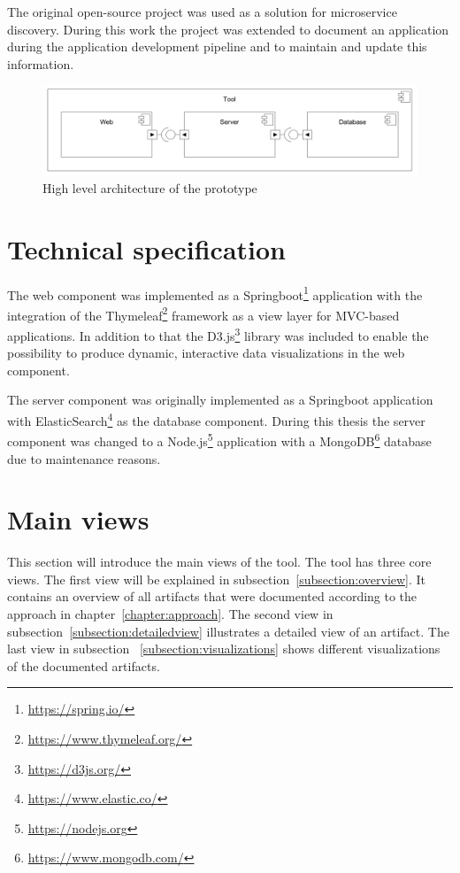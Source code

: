 The original open-source project was used as a solution for microservice discovery. During this work the project was extended to document an application during the application development pipeline and to maintain and update this information.

\begin{figure}[htpb]
  \centering
  \includegraphics[width=1.0\textwidth]{figures/pivio-highlevel2.PNG}
  \caption{High level architecture of the prototype}
  \label{fig:pivio-highlevel}
\end{figure}

\section{Technical specification}
The web component was implemented as a Springboot\footnote{\url{https://spring.io/}} application with the integration of the Thymeleaf\footnote{\url{https://www.thymeleaf.org/}} framework as a view layer for MVC-based applications. In addition to that the D3.js\footnote{\url{https://d3js.org/}} library was included to enable the possibility to produce dynamic, interactive data visualizations in the web component.

The server component was originally implemented as a Springboot application with ElasticSearch\footnote{\url{https://www.elastic.co/}} as the database component. During this thesis the server component was changed to a Node.js\footnote{\url{https://nodejs.org}} application with a MongoDB\footnote{\url{https://www.mongodb.com/}} database due to maintenance reasons.

\section{Main views} 
This section will introduce the main views of the tool. The tool has three core views. The first view will be explained in subsection~\ref{subsection:overview}. It contains an overview of all artifacts that were documented according to the approach in chapter~\ref{chapter:approach}. The second view in subsection~\ref{subsection:detailedview} illustrates a detailed view of an artifact. The last view in subsection ~\ref{subsection:visualizations} shows different visualizations of the documented artifacts.

